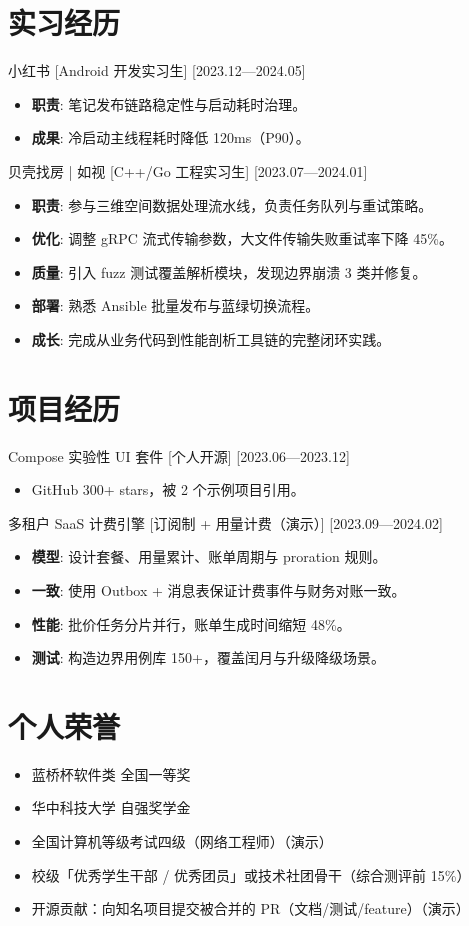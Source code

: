 \documentclass{resume-photo}
\begin{document}
\section{实习经历}
\ResumeItem
{小红书}
[\textnormal{Android 开发实习生}]
[2023.12—2024.05]

\begin{itemize}
  \item \textbf{职责}: 笔记发布链路稳定性与启动耗时治理。
  \item \textbf{成果}: 冷启动主线程耗时降低 120ms（P90）。
\end{itemize}


\ResumeItem
{贝壳找房 | 如视}
[\textnormal{C++/Go 工程实习生}]
[2023.07—2024.01]

\begin{itemize}
  \item \textbf{职责}: 参与三维空间数据处理流水线，负责任务队列与重试策略。
  \item \textbf{优化}: 调整 gRPC 流式传输参数，大文件传输失败重试率下降 45\%。
  \item \textbf{质量}: 引入 fuzz 测试覆盖解析模块，发现边界崩溃 3 类并修复。
  \item \textbf{部署}: 熟悉 Ansible 批量发布与蓝绿切换流程。
  \item \textbf{成长}: 完成从业务代码到性能剖析工具链的完整闭环实践。
\end{itemize}



\section{项目经历}
\ResumeItem
{Compose 实验性 UI 套件}
[\textnormal{个人开源}]
[2023.06—2023.12]

\begin{itemize}
  \item GitHub 300+ stars，被 2 个示例项目引用。
\end{itemize}


\ResumeItem
{多租户 SaaS 计费引擎}
[\textnormal{订阅制 + 用量计费（演示）}]
[2023.09—2024.02]

\begin{itemize}
  \item \textbf{模型}: 设计套餐、用量累计、账单周期与 proration 规则。
  \item \textbf{一致}: 使用 Outbox + 消息表保证计费事件与财务对账一致。
  \item \textbf{性能}: 批价任务分片并行，账单生成时间缩短 48\%。
  \item \textbf{测试}: 构造边界用例库 150+，覆盖闰月与升级降级场景。
\end{itemize}



\section{个人荣誉}
\begin{itemize}
  \item 蓝桥杯软件类 全国一等奖
  \item 华中科技大学 自强奖学金
  \item 全国计算机等级考试四级（网络工程师）（演示）
  \item 校级「优秀学生干部 / 优秀团员」或技术社团骨干（综合测评前 15\%）
  \item 开源贡献：向知名项目提交被合并的 PR（文档/测试/feature）（演示）
\end{itemize}
\end{document}
